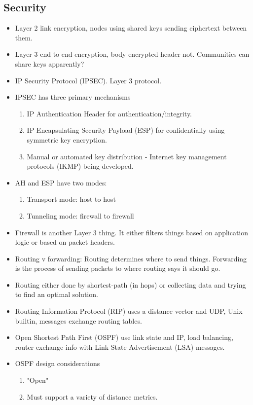 \documentclass{scrartcl}
\begin{document}
\subsection*{Security}
\begin{itemize}
\item Layer 2 link encryption, nodes using shared keys sending ciphertext 
between them.
\item Layer 3 end-to-end encryption, body encrypted header not. Communities can share keys apparently?
\item IP Security Protocol (IPSEC). Layer 3 protocol.
\item IPSEC has three primary mechanisms
\begin{enumerate}
\item IP Authentication Header for authentication/integrity.
\item IP Encapsulating Security Payload (ESP) for confidentially using symmetric
key encryption.
\item Manual or automated key distribution - Internet key management protocols
(IKMP) being developed.
\end{enumerate}
\item AH and ESP have two modes:
\begin{enumerate}
\item Transport mode: host to host
\item Tunneling mode: firewall to firewall
\end{enumerate}
\item Firewall is another Layer 3 thing. It either filters things based on application logic or based on packet headers.
\item Routing v forwarding: Routing determines where to send things. Forwarding is the process of sending packets to where routing says it should go.
\item Routing either done by shortest-path (in hops) or collecting data and 
trying to find an optimal solution.
\item Routing Information Protocol (RIP) uses a distance vector and UDP,
Unix builtin, messages exchange routing tables.
\item Open Shortest Path First (OSPF) use link state and IP, load balancing,
router exchange info with Link State Advertisement (LSA) messages.
\item OSPF design considerations
\begin{enumerate}
\item "Open"
\item Must support a variety of distance metrics.

\end{enumerate}
\end{itemize}
\end{document}
